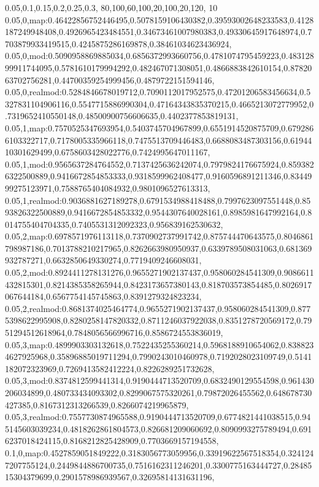 0.05,0.1,0.15,0.2,0.25,0.3,
80,100,60,100,20,100,20,120,
10
0.05,0,map:0.46422856752446495,0.5078159106430382,0.39593002648233583,0.4128187249948408,0.4926965423484551,0.34673461007980383,0.49330645917648974,0.7703879933419515,0.4245875286169878,0.38461034623436924,
0.05,0,mod:0.5090958869885034,0.6856372993660756,0.4781074795459223,0.48312899911744095,0.5781610179994292,0.482467071308051,0.4866883842610154,0.8782063702756281,0.44700359254999456,0.4879722151594146,
0.05,0,realmod:0.5284846678019712,0.7090112017952575,0.47201206583456634,0.5327831104906116,0.5547715886990304,0.47164343835370215,0.4665213072779952,0.7319652410550148,0.48500900756606635,0.4402377853819131,
0.05,1,map:0.7570525347693954,0.5403745704967899,0.6551914520875709,0.6792866103322717,0.7178005335966118,0.7475513709446483,0.6688083487303156,0.6194410301629499,0.6758603428022776,0.7424995647011167,
0.05,1,mod:0.9565637284764552,0.7137425636242074,0.7979824176675924,0.8593826322500889,0.9416672854853333,0.9318599962408477,0.9160596891211346,0.8344999275123971,0.7588765404084932,0.9801096527613313,
0.05,1,realmod:0.9036881627189278,0.6791534988418488,0.7997623097551448,0.8593826322500889,0.9416672854853332,0.9544307640028161,0.8985981647992164,0.8014755404704335,0.7405531312092323,0.956839162530632,
0.05,2,map:0.6978571976113118,0.7370902737991742,0.875744470643575,0.8046861798987186,0.7013788210217965,0.8262663980950937,0.6339789508031063,0.681369932787271,0.6632850649330274,0.7719409246608031,
0.05,2,mod:0.8924411278131276,0.9655271902137437,0.958060284541309,0.9086611432815301,0.8214385358265944,0.8423173657380143,0.818703573854485,0.8026917067644184,0.6567754145745863,0.8391279324823234,
0.05,2,realmod:0.8681374025464774,0.9655271902137437,0.958060284541309,0.8775398622995908,0.8280258147820332,0.8711246037922038,0.8351278720569172,0.7951294512618964,0.7848056566996716,0.8586724553836019,
0.05,3,map:0.4899903303132618,0.7522435255360214,0.5968188910654062,0.8388234627925968,0.35896885019711294,0.7990243010460978,0.7192028023109749,0.5141182072323969,0.7269413582412224,0.8226289251732628,
0.05,3,mod:0.8374812599441314,0.9190444713520709,0.6832490129554598,0.961430206034899,0.480733434093302,0.8299067575320261,0.79872026455562,0.648678730427385,0.8167312313266539,0.8266074219965879,
0.05,3,realmod:0.7557730874965588,0.9190444713520709,0.6774821441038515,0.945145603039234,0.4818262861804573,0.826681209060692,0.8090993275789494,0.6916237018424115,0.8168212825428909,0.7703669157194558,
0.1,0,map:0.4527859051849222,0.3183056773059956,0.33919622567518354,0.3241247207755124,0.2449844886700735,0.7516162311246201,0.3300775163444727,0.2848515304379699,0.2901578986939567,0.32695814131631196,
